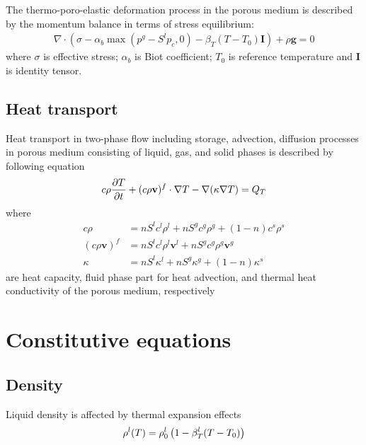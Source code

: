 The thermo-poro-elastic deformation process in the porous medium is described by the momentum balance in terms of stress equilibrium:
\begin{align}
\nabla\cdot
\left(
\sigma - \alpha_b \max(p^g-S^l p_c, 0) - \beta_T (T-T_0) \mathbf I
\right)
+ \rho \mathbf g
=
0
\end{align}
where
$\sigma$ is effective stress;
$\alpha_b$ is Biot coefficient;
$T_0$ is reference temperature and
$\mathbf I$ is identity tensor.

\subsection{Heat transport}

Heat transport in two-phase flow including storage, advection, diffusion processes in porous medium consisting of liquid, gas, and solid phases is described by following equation
\begin{align}
c\rho \frac{\partial T}{\partial t} + (c\rho \mathbf v)^f \cdot \nabla T - \nabla (\kappa \nabla T) = Q_T
\end{align}
where
\begin{align}
c\rho &= nS^l c^l \rho^l + nS^g c^g \rho^g + (1-n) c^s \rho^s
\nonumber
\\
(c\rho \mathbf v)^f &= nS^l c^l \rho^l \mathbf v^l + nS^g c^g \rho^g \mathbf v^g
\\
\kappa &= nS^l \kappa^l + nS^g \kappa^g + (1-n) \kappa^s
\nonumber
\end{align}
are heat capacity, fluid phase part for heat advection, and thermal heat conductivity of the porous medium, respectively

\section{Constitutive equations}
\subsection{Density}

Liquid density is affected by thermal expansion effects
\begin{align}
\rho^l(T) = \rho_0^l \left( 1 - \beta_T^l (T-T_0) \right)
\end{align}

